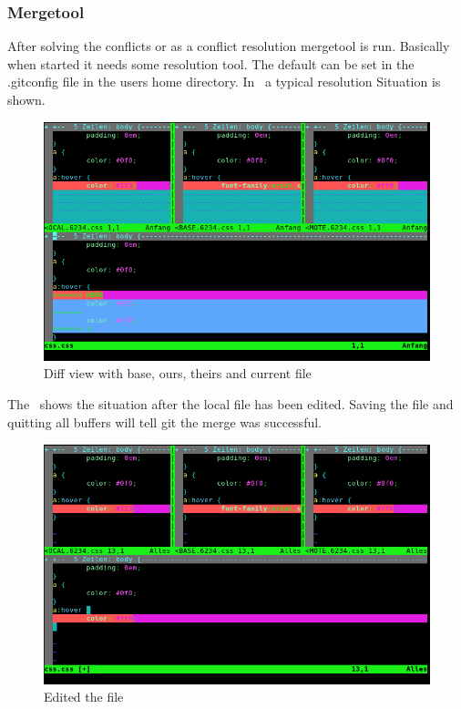 \subsubsection{Mergetool}
After solving the conflicts or as a conflict resolution mergetool is run. Basically when started it needs some resolution tool. The default can be set in the .gitconfig file in the users home directory. In~ a typical resolution Situation is shown.
\label{fig:diff_view00}
\begin{figure}[htbp]
  \centering
  \includegraphics[width=\textwidth]{vimdiff_mergetool_00.png}
  \caption{Diff view with base, ours, theirs and current file}
\end{figure}

The~ shows the situation after the local file has been edited. Saving the file and quitting all buffers will tell git the merge was successful.
\label{fig:diff_view01}
\begin{figure}[htbp]
  \centering
  \includegraphics[width=\textwidth]{vimdiff_mergetool_01.png}
  \caption{Edited the file}
\end{figure}

